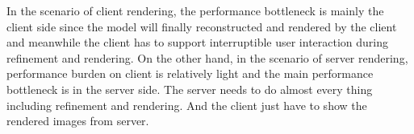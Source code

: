In the scenario of client rendering, the performance bottleneck is mainly the client side since the model will finally reconstructed and rendered by the client and meanwhile the client has to support interruptible user interaction during refinement and rendering. On the other hand, in the scenario of server rendering, performance burden on client is relatively light and the main performance bottleneck is in the server side. The server needs to do almost every thing including refinement and rendering. And the client just have to show the rendered images from server. \\ 




